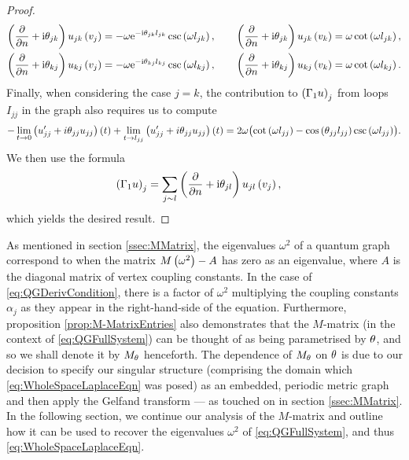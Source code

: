 \begin{proof}
\begin{align*}
		\left( \dfrac{\partial }{\partial n}+\mathrm{i}\theta_{jk} \right)u_{jk}\left( v_j \right) = -\omega \mathrm{e}^{-\mathrm{i}\theta_{jk}l_{jk}}\csc\left( \omega l_{jk} \right), 
		&\qquad \left( \dfrac{\partial }{\partial n}+\mathrm{i}\theta_{jk} \right)u_{jk}\left( v_k \right) = \omega\cot\left( \omega l_{jk} \right), \\
		\left( \dfrac{\partial }{\partial n}+\mathrm{i}\theta_{kj} \right)u_{kj}\left( v_j \right) = -\omega \mathrm{e}^{-\mathrm{i}\theta_{kj}l_{kj}}\csc\left( \omega l_{kj} \right), 
		&\qquad \left( \dfrac{\partial }{\partial n}+\mathrm{i}\theta_{kj} \right)u_{kj}\left( v_k \right) = \omega\cot\left( \omega l_{kj} \right).
	\end{align*}
	Finally, when considering the case $j=k$, the contribution to $\left( \Gamma_1 u \right)_j$ from loops $I_{jj}$ in the graph also requires us to compute
	\begin{align*}
		-\lim_{t\rightarrow0}\left( u_{jj}'+i\theta_{jj}u_{jj} \right)(t) + \lim_{t\rightarrow l_{jj}}\left( u_{jj}'+i\theta_{jj}u_{jj} \right)(t)
		= 2\omega\bigl( \cot\left( \omega l_{jj} \right) - \cos\left( \theta_{jj}l_{jj} \right)\csc\left( \omega l_{jj} \right) \bigr).	
	\end{align*}
	We then use the formula
	\begin{align*}
		\left( \Gamma_1 u \right)_j &= \sum_{j\sim l} \left( \dfrac{\partial }{\partial n}+\mathrm{i}\theta_{jl} \right)u_{jl}\left( v_j \right),
	\end{align*}
	which yields the desired result.
\end{proof}

As mentioned in section \ref{ssec:MMatrix}, the eigenvalues $\omega^2$ of a quantum graph correspond to when the matrix $M\left( \omega^2 \right) - A$ has zero as an eigenvalue, where $A$ is the diagonal matrix of vertex coupling constants.
In the case of \eqref{eq:QGDerivCondition}, there is a factor of $\omega^2$ multiplying the coupling constants $\alpha_j$ as they appear in the right-hand-side of the equation.
Furthermore, proposition \ref{prop:M-MatrixEntries} also demonstrates that the $M$-matrix (in the context of \eqref{eq:QGFullSystem}) can be thought of as being parametrised by $\theta$, and so we shall denote it by $M_{\theta}$ henceforth.
The dependence of $M_\theta$ on $\theta$ is due to our decision to specify our singular structure (comprising the domain which \eqref{eq:WholeSpaceLaplaceEqn} was posed) as an embedded, periodic metric graph and then apply the Gelfand transform --- as touched on in section \ref{ssec:MMatrix}.
In the following section, we continue our analysis of the $M$-matrix and outline how it can be used to recover the eigenvalues $\omega^2$ of \eqref{eq:QGFullSystem}, and thus \eqref{eq:WholeSpaceLaplaceEqn}. 

